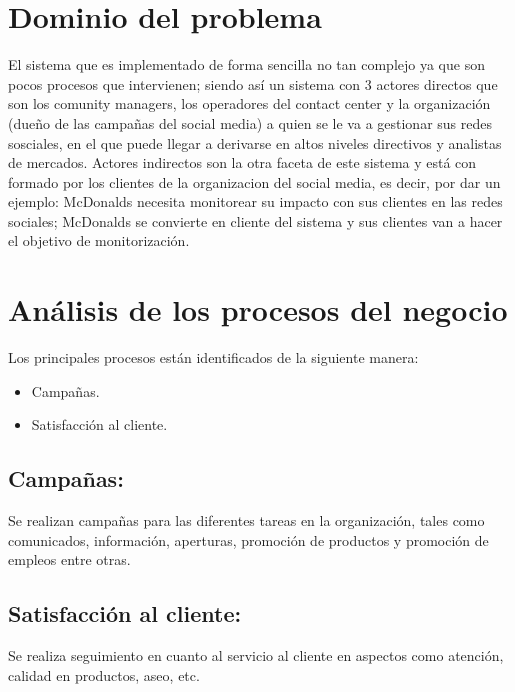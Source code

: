 \section{Dominio del problema}
El sistema que es implementado de forma sencilla no tan complejo ya que son pocos procesos que intervienen; siendo as\'i un sistema con 3 actores directos que son los comunity managers, los operadores del contact center y la organizaci\'on (due\~no de las campa\~nas del social media) a quien se le va a gestionar sus redes sosciales, en el que puede llegar a derivarse en altos niveles directivos y analistas de mercados. Actores indirectos son la otra faceta de este sistema y est\'a con formado por los clientes de la organizacion del social media, es decir, por dar un ejemplo: McDonalds necesita monitorear su impacto con sus clientes en las redes sociales; McDonalds se convierte en cliente del sistema y sus clientes van a hacer el objetivo de monitorizaci\'on.%
%
\section{An\'alisis de los procesos del negocio}
Los principales procesos est\'an identificados de la siguiente manera:%
	\begin{itemize}
		\item Campa\~nas.
		\item Satisfacci\'on al cliente.
	\end{itemize}
\subsection{Campa\~nas:}
Se realizan campa\~nas para las diferentes tareas en la organizaci\'on, tales como comunicados, informaci\'on, aperturas, promoci\'on de productos y promoci\'on de empleos entre otras.%
%
\subsection{Satisfacci\'on al cliente:}Se realiza seguimiento en cuanto al servicio al cliente en aspectos como atenci\'on, calidad en productos, aseo, etc.%
%
